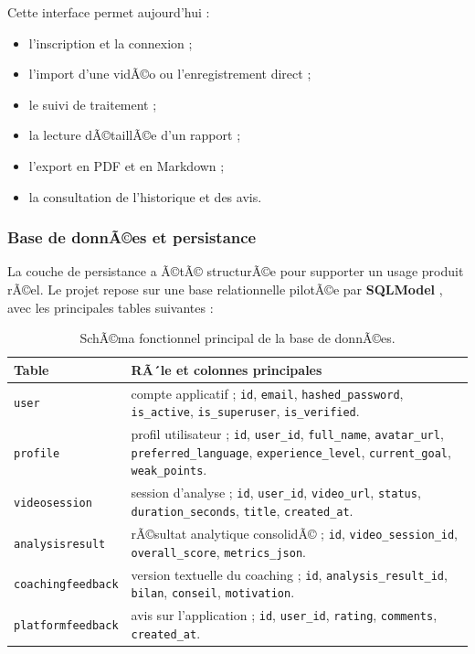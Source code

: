 ﻿\documentclass[12pt,a4paper]{article}
\begin{document}
Cette interface permet aujourd'hui :
\begin{itemize}
    \item l'inscription et la connexion ;
    \item l'import d'une vidÃ©o ou l'enregistrement direct ;
    \item le suivi de traitement ;
    \item la lecture dÃ©taillÃ©e d'un rapport ;
    \item l'export en PDF et en Markdown ;
    \item la consultation de l'historique et des avis.
\end{itemize}

\subsubsection{Base de donnÃ©es et persistance}
La couche de persistance a Ã©tÃ© structurÃ©e pour supporter un usage produit rÃ©el. Le projet repose sur une base relationnelle pilotÃ©e par \textbf{SQLModel} \cite{sqlmodel}, avec les principales tables suivantes :

\begin{table}[H]
    \centering
    \small
    \begin{tabularx}{\textwidth}{@{}l >{\raggedright\arraybackslash}X @{}}
        \toprule
        \textbf{Table} & \textbf{RÃ´le et colonnes principales} \\
        \midrule
        \texttt{user} & compte applicatif ; \texttt{id}, \texttt{email}, \texttt{hashed\_password}, \texttt{is\_active}, \texttt{is\_superuser}, \texttt{is\_verified}. \\
        \texttt{profile} & profil utilisateur ; \texttt{id}, \texttt{user\_id}, \texttt{full\_name}, \texttt{avatar\_url}, \texttt{preferred\_language}, \texttt{experience\_level}, \texttt{current\_goal}, \texttt{weak\_points}. \\
        \texttt{videosession} & session d'analyse ; \texttt{id}, \texttt{user\_id}, \texttt{video\_url}, \texttt{status}, \texttt{duration\_seconds}, \texttt{title}, \texttt{created\_at}. \\
        \texttt{analysisresult} & rÃ©sultat analytique consolidÃ© ; \texttt{id}, \texttt{video\_session\_id}, \texttt{overall\_score}, \texttt{metrics\_json}. \\
        \texttt{coachingfeedback} & version textuelle du coaching ; \texttt{id}, \texttt{analysis\_result\_id}, \texttt{bilan}, \texttt{conseil}, \texttt{motivation}. \\
        \texttt{platformfeedback} & avis sur l'application ; \texttt{id}, \texttt{user\_id}, \texttt{rating}, \texttt{comments}, \texttt{created\_at}. \\
        \bottomrule
    \end{tabularx}
    \caption{SchÃ©ma fonctionnel principal de la base de donnÃ©es.}
\end{table}
\end{document}
